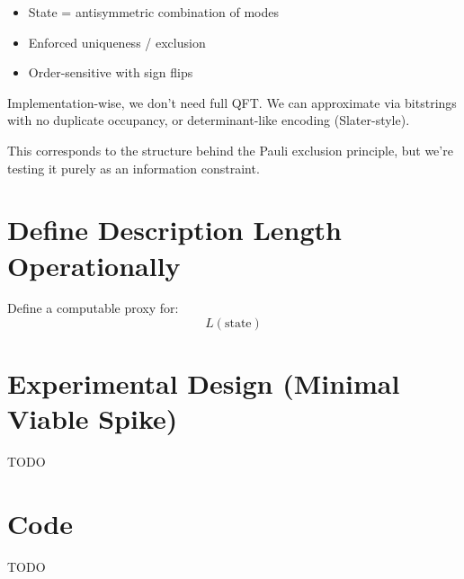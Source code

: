 \documentclass[11pt]{article}
\begin{document}
\begin{itemize}
\item State = antisymmetric combination of modes
\item Enforced uniqueness / exclusion
\item Order-sensitive with sign flips
\end{itemize}

Implementation-wise, we don’t need full QFT. We can approximate via bitstrings with no duplicate occupancy, or determinant-like encoding (Slater-style).

This corresponds to the structure behind the Pauli exclusion principle, but we’re testing it purely as an information constraint.


\section{Define Description Length Operationally}

Define a computable proxy for:
\[
L(\text{state})
\]


\section{Experimental Design (Minimal Viable Spike)}

TODO

\section{Code}

TODO

\printbibliography
\end{document}
